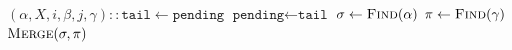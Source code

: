 \documentclass[a4paper,UKenglish,cleveref, autoref]{lipics-v2021}
\begin{document}
\begin{algorithm}
\begin{algorithmic}[1]
                                     
  \State $(\alpha, X, i, \beta, j, \gamma) :: \texttt{tail} \gets \texttt{pending}$     
  \State $\texttt{pending} \gets \texttt{tail}$    
  \State $\sigma \gets \Call{Find}{\alpha}$
  \State $\pi \gets \Call{Find}{\gamma}$ 
  \If{$\sigma \neq \pi$}                                                        
  \State $\Call{Merge}{\sigma, \pi}$                                                                        
  \EndIf
  \EndWhile
  \EndProcedure
\end{algorithmic}
\caption{Algorithm to collapse dense recursive mazes. \label{algo:main-dense}}
\end{algorithm}
\end{document}
